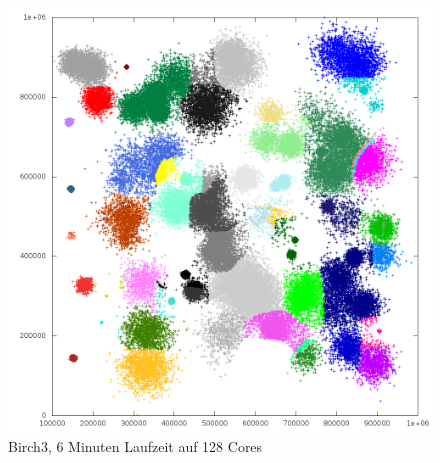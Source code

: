 	\begin{figure}[H]
		\centering
		\includegraphics[scale=0.61]{../meanshift/output/pics/birch3_colored.png} 
		\vspace{-5pt}
		\caption{Birch3, 6 Minuten Laufzeit auf 128 Cores}
	\end{figure}
	\newpage
